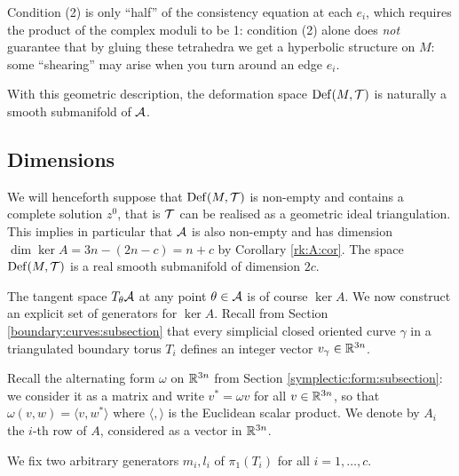 Condition (2) is only ``half'' of the consistency equation at each $e_i$, which requires the product of the complex moduli to be 1: condition (2) alone does \emph{not} guarantee that by gluing these tetrahedra we get a hyperbolic structure on $M$: some ``shearing'' may arise when you turn around an edge $e_i$.

With this geometric description, the deformation space ${\rm Def}(M,\mathcal{T})$ is naturally a smooth submanifold of $\mathcal{A}$. 

\subsection{Dimensions}
We will henceforth suppose that ${\rm Def}(M,\mathcal{T})$ is non-empty and contains a complete solution $z^0$, that is $\mathcal{T}$ can be realised as a geometric ideal triangulation. This implies in particular that $\mathcal{A}$ is also non-empty and has dimension $\dim\ker A = 3n - (2n-c) =n+c$ by Corollary \ref{rk:A:cor}. The space ${\rm Def}(M,\mathcal{T})$ is a real smooth submanifold of dimension $2c$. 

The tangent space $T_\theta\mathcal{A}$ at any point $\theta\in\mathcal{A}$ is of course $\ker A$. We now construct an explicit set of generators for $\ker A$. Recall from Section \ref{boundary:curves:subsection} that every simplicial closed oriented curve $\gamma$ in a triangulated boundary torus $T_i$ defines an integer vector $v_\gamma \in \mathbb{R}^{3n}$. 

Recall the alternating form $\omega$ on $\mathbb{R}^{3n}$ from Section \ref{symplectic:form:subsection}: we consider it as a matrix and write $v^* = \omega v$ for all $v\in \mathbb{R}^{3n}$, so that $\omega(v,w) = \langle v, w^* \rangle$ where $\langle, \rangle$ is the Euclidean scalar product. We denote by $A_i$ the $i$-th row of $A$, considered as a vector in $\mathbb{R}^{3n}$.

We fix two arbitrary generators $m_i, l_i$ of $\pi_1(T_i)$ for all $i=1,\ldots, c$.


